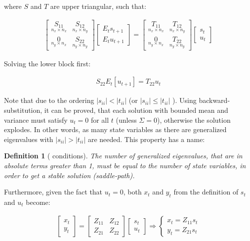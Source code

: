 \documentclass{pracamgr}
\numberwithin{equation}{section}
\newtheorem{mydef}{Definition}
\begin{document}
where $S$ and $T$ are upper triangular, such that:

\begin{align}
\begin{bmatrix} \underset{n_x \times n_x}{S_{11}} & \underset{n_x \times n_y}{S_{12}} \\ \underset{n_y \times n_x}{0} & \underset{n_y \times n_y}{S_{22}}\end{bmatrix} \begin{bmatrix} E_t s_{t+1}\\ E_t u_{t+1} \end{bmatrix} = \begin{bmatrix} \underset{n_x \times n_x}{T_{11}} & \underset{n_x \times n_y}{T_{12}} \\ \underset{n_y \times n_x}{0} & \underset{n_y \times n_y}{T_{22}}\end{bmatrix} \begin{bmatrix} s_t \\ u_t \end{bmatrix}
\end{align}

Solving the lower block first:

\begin{align}
  S_{22} E_t[u_{t+1}] = T_{22} u_t
\end{align}

Note that due to the ordering $|s_{ii}|<|t_{ii}|$ (or $|s_{ii}|\leq|t_{ii}|$ ). Using backward-substitution, it can be proved, that each solution with bounded mean and variance must satisfy $u_t=0$ for all $t$ (unless $\Sigma=0$), otherwise the solution explodes. In other words, as many state variables as there are generalized eigenvalues with $|s_{ii}|>|t_{ii}|$ are needed. This property has a name:

\begin{mydef}[\citet{blanchard1980solution} conditions]
The number of generalized eigenvalues, that are in absolute terms greater than 1, must be equal to the number of state variables, in order to get a stable solution (saddle-path).
\end{mydef}

Furthermore, given the fact that $u_t=0$, both $x_t$ and $y_t$ from the definition of $s_t$ and $u_t$ become:

\begin{align}
  \begin{bmatrix} x_t \\ y_t \end{bmatrix} = \begin{bmatrix} Z_{11} & Z_{12}\\ Z_{21} & Z_{22} \end{bmatrix} \begin{bmatrix} s_t \\ u_t \end{bmatrix}
  \Rightarrow
  \begin{cases}
    x_t = Z_{11} s_t\\
    y_t = Z_{21} s_t
  \end{cases}
\end{align}
\end{document}
